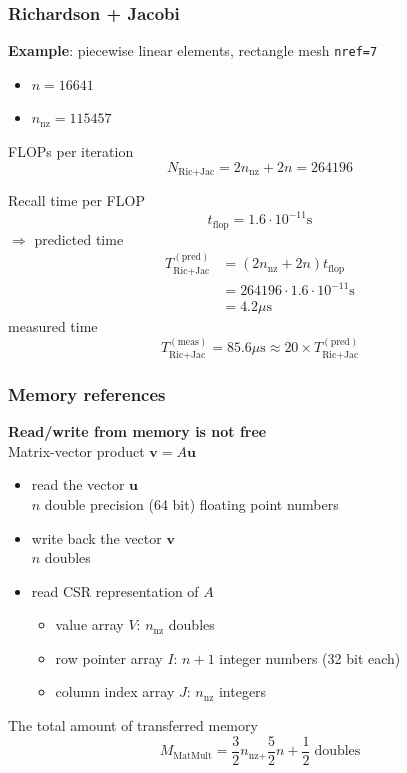 \documentclass{beamer}
\begin{document}
\begin{frame}[fragile]
  \frametitle{Richardson + Jacobi}
  \textbf{Example}: piecewise linear elements, rectangle mesh \lstinline{nref=7}
  \begin{itemize}
  \item $n=16641$
  \item $n_{\text{nz}}=115457$
  \end{itemize}
  FLOPs per iteration
  $$N_{\text{Ric+Jac}} = 2n_{\text{nz}} + 2n = 264196$$
  
  Recall time per FLOP
  $$t_{\text{flop}} = 1.6\cdot 10^{-11}\text{s}$$
  $\Rightarrow$ predicted time
$$
\begin{aligned}
T_{\text{Ric+Jac}}^{(\text{pred})} &= (2n_{\text{nz}} + 2n)t_{\text{flop}}\\
&= 264196 \cdot 1.6\cdot 10^{-11}\text{s}\\
&= 4.2\mu\text{s}
\end{aligned}
$$
measured time
$$T_{\text{Ric+Jac}}^{(\text{meas})} = 85.6\mu\text{s}\approx 20\times T_{\text{Ric+Jac}}^{(\text{pred})}$$
\end{frame}


\begin{frame}
  \frametitle{Memory references}
\textbf{Read/write from memory is not free}\\
Matrix-vector product $\boldsymbol{v} = A\boldsymbol{u}$
\begin{itemize}
  \item read the vector $\boldsymbol{u}$\\
    $n$ double precision (64 bit) floating point numbers
  \item write back the vector $\boldsymbol{v}$\\
    $n$ doubles
  \item read CSR representation of $A$
  \begin{itemize}
    \item value array $V$: $n_{\text{nz}}$ doubles
    \item row pointer array $I$: $n+1$ integer numbers (32 bit each)
    \item column index array $J$: $n_{\text{nz}}$ integers
  \end{itemize}
\end{itemize} 
The total amount of transferred memory 
$$
M_{\text{MatMult}} = \frac{3}{2} n_{\text{nz} + }\frac{5}{2} n + \frac{1}{2}\;\text{doubles}
$$
\end{frame}
\end{document}
